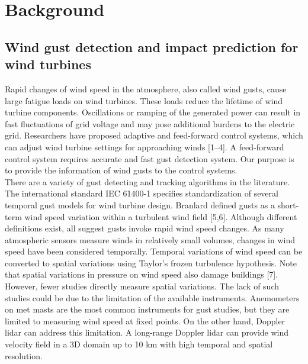 \chapter{Background}
\section{Wind gust detection and impact prediction for wind turbines}
Rapid changes of wind speed in the atmosphere, also called wind gusts, cause large fatigue loads on wind turbines. These loads reduce the lifetime of wind turbine components. Oscillations or ramping of the generated power can result in fast fluctuations of grid voltage and may pose additional burdens to the electric grid. Researchers have proposed adaptive and feed-forward control systems, which can adjust wind turbine settings for approaching winds [1–4]. A feed-forward control system requires accurate and fast gust detection system. Our purpose is to provide the information of wind gusts to the control systems.\\
There are a variety of gust detecting and tracking algorithms in the literature. The international standard IEC 61400-1 specifies standardization of several temporal gust models for wind turbine design. Branlard defined gusts as a short-term wind speed variation within a turbulent wind field [5,6]. Although different definitions exist, all suggest gusts invoke rapid wind speed changes. As many atmospheric sensors measure winds in relatively small volumes, changes in wind speed have been considered temporally. Temporal variations of wind speed can be converted to spatial variations using Taylor’s frozen turbulence hypothesis. Note that spatial variations in pressure on wind speed also damage buildings [7]. However, fewer studies directly measure spatial variations. The lack of such studies could be due to the limitation of the available instruments. Anemometers on met masts are the most common instruments for gust studies, but they are limited to measuring wind speed at fixed points. On the other hand, Doppler lidar can address this limitation. A long-range Doppler lidar can provide wind velocity field in a 3D domain up to 10 km with high temporal and spatial resolution.\\
